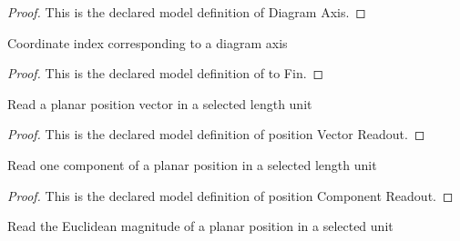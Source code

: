 \begin{proof}
  This is the declared model definition of Diagram Axis.
\end{proof}
\begin{definition}[to Fin]
  \label{def:physics:phyx-mini-0679:phyxminiproblems-problemphyxmini0679-diagramaxis-tofin}
  Coordinate index corresponding to a diagram axis
\end{definition}
\begin{proof}
  This is the declared model definition of to Fin.
\end{proof}
\begin{definition}
  \label{def:physics:phyx-mini-0679:phyxminiproblems-problemphyxmini0679-positionvectorreadout}
  Read a planar position vector in a selected length unit
\end{definition}
\begin{proof}
  This is the declared model definition of position Vector Readout.
\end{proof}
\begin{definition}
  \label{def:physics:phyx-mini-0679:phyxminiproblems-problemphyxmini0679-positioncomponentreadout}
  Read one component of a planar position in a selected length unit
\end{definition}
\begin{proof}
  This is the declared model definition of position Component Readout.
\end{proof}
\begin{definition}
  \label{def:physics:phyx-mini-0679:phyxminiproblems-problemphyxmini0679-positionmagnitudereadout}
  Read the Euclidean magnitude of a planar position in a selected unit
\end{definition}
